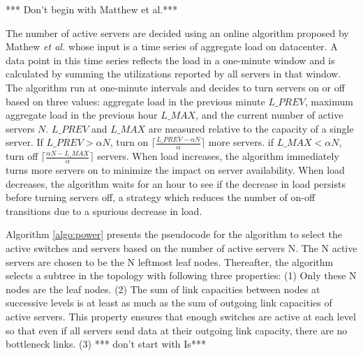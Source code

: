 
*** Don't begin with Matthew et al.***

The number of active servers are decided using an online algorithm proposed by Mathew \emph{et al.}  \cite{mathew12} whose input is a time series of aggregate load on datacenter. A data point in this time series reflects the load in a one-minute window and is calculated by summing the utilizations reported by all servers in that window. The algorithm run at one-minute intervals and decides to turn servers on or off based on three values: aggregate load in the previous minute $L\_PREV$, maximum aggregate load in the previous hour $L\_MAX$, and the current number of active servers $N$. $L\_PREV$ and $L\_MAX$ are measured relative to the capacity of a single server. If $L\_PREV > \alpha N$, turn on $\lceil \frac{L\_PREV - \alpha N}{\alpha} \rceil $ more servers. if  $L\_MAX < \alpha N$, turn off $\lceil \frac{\alpha N - L\_MAX}{\alpha} \rceil$ servers. When load increases, the algorithm immediately turns more servers on to minimize the impact on server availability.  When load decreases, the algorithm waits for an hour to see if the decrease in load persists before turning servers off, a strategy which reduces the number of on-off transitions due to a spurious decrease in load.


Algorithm \ref{algo:power} presents the pseudocode for the algorithm to select the active switches and servers based on the number of active servers N. The N active servers are chosen to be the N leftmost leaf nodes. Thereafter, the algorithm selects a subtree in the topology with following three properties: (1) Only these N nodes are the leaf nodes. (2) The sum of link capacities between nodes at successive levels is at least as much as the sum of outgoing link capacities of active servers. This property ensures that enough switches are active at each level so that  even if all servers send data at their outgoing link capacity, there are no bottleneck links. (3) 
*** don't start with Is***


